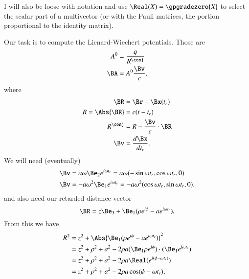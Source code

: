 {I will also be loose with notation and use \(\Real(X) = \gpgradezero{X}\) to select the scalar part of a multivector (or with the Pauli matrices, the portion proportional to the identity matrix).

Our task is to compute the Lienard-Wiechert potentials.  Those are
%
\begin{equation}\label{eqn:relativisticElectrodynamicsExamReflection:50}
\begin{aligned}
A^0 &= \frac{q}{R^\conj} \\
\BA &= A^0 \frac{\Bv}{c},
\end{aligned}
\end{equation}
%
where
%
\begin{equation}\label{eqn:relativisticElectrodynamicsExamReflection:70}
\begin{aligned}
\BR &= \Br - \Bx(t_r) \\
R = \Abs{\BR} &= c (t - t_r) \\
R^\conj &= R - \frac{\Bv}{c} \cdot \BR \\
\Bv &= \frac{d\Bx}{dt_r}.
\end{aligned}
\end{equation}
%
We will need (eventually)
%
\begin{equation}\label{eqn:relativisticElectrodynamicsExamReflection:90}
\begin{aligned}
\Bv &= a \omega \Be_2 e^{i \omega t_r} = a \omega ( -\sin \omega t_r, \cos\omega t_r, 0) \\
\dot{\Bv} &= -a \omega^2 \Be_1 e^{i \omega t_r} =
-a \omega^2 (\cos\omega t_r, \sin\omega t_r, 0).
\end{aligned}
\end{equation}
%
and also need our retarded distance vector
%
\begin{equation}\label{eqn:relativisticElectrodynamicsExamReflection:110}
\BR = z \Be_3 + \Be_1 (\rho e^{i \phi} - a e^{i \omega t_r} ),
\end{equation}
%
From this we have
%
\begin{equation}\label{eqn:relativisticElectrodynamicsExamReflection:1050}
\begin{aligned}
R^2
&= z^2 + \Abs{\Be_1 (\rho e^{i \phi} - a e^{i \omega t_r} )}^2 \\
&= z^2 + \rho^2 + a^2 - 2 \rho a (\Be_1 \rho e^{i \phi}) \cdot (\Be_1 e^{i \omega t_r}) \\
&= z^2 + \rho^2 + a^2 - 2 \rho a \Real( e^{ i(\phi - \omega t_r) } ) \\
&= z^2 + \rho^2 + a^2 - 2 \rho a \cos(\phi - \omega t_r),

\end{aligned}
\end{equation}}
